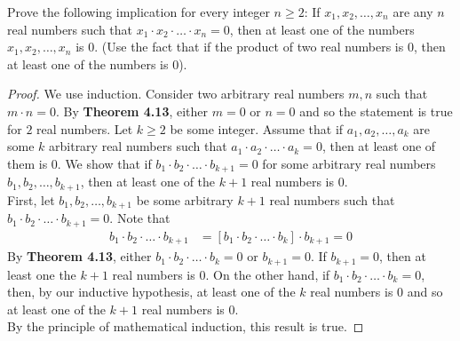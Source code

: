 \documentclass[12pt]{article}
\newenvironment{problem}[2][Problem]{\begin{trivlist}
		\item[\hskip \labelsep {\bfseries #1}\hskip \labelsep {\bfseries #2.}]}{\end{trivlist}}
\begin{document}
\begin{problem}{19}
	Prove the following implication for every integer $n\geq 2$: If $x_{1},x_{2},\ldots,x_{n}$ are any $n$ real numbers such that $x_{1}\cdot x_{2}\cdot \ldots \cdot x_{n} = 0$, then at least one of the numbers $x_{1},x_{2},\ldots,x_{n}$ is 0. (Use the fact that if the product of two real numbers is 0, then at least one of the numbers is 0).
	
	\begin{proof}
		We use induction. Consider two arbitrary real numbers $m,n$ such that $m\cdot n = 0$. By \textbf{Theorem 4.13}, either $m=0$ or $n = 0$ and so the statement is true for $2$ real numbers. Let $k\geq 2$ be some integer. Assume that if $a_{1}, a_{2}, \ldots, a_{k}$ are some $k$ arbitrary real numbers such that $a_{1}\cdot a_{2}\cdot \ldots \cdot a_{k} = 0$, then at least one of them is 0. We show that if $b_{1}\cdot b_{2}\cdot \ldots \cdot b_{k+1} = 0$ for some arbitrary real numbers $b_{1}, b_{2}, \ldots, b_{k+1}$, then at least one of the $k+1$ real numbers is 0. \\
		
		First, let $b_{1}, b_{2}, \ldots, b_{k+1}$ be some arbitrary $k+1$ real numbers such that $b_{1}\cdot b_{2}\cdot \ldots \cdot b_{k+1} = 0$. Note that
		\begin{align*}
			b_{1}\cdot b_{2}\cdot \ldots \cdot b_{k+1} &= [b_{1}\cdot b_{2}\cdot \ldots \cdot b_{k}] \cdot b_{k+1} = 0
		\end{align*}
	By \textbf{Theorem 4.13}, either $b_{1}\cdot b_{2}\cdot \ldots \cdot b_{k} = 0$ or $b_{k+1} = 0$. If $b_{k+1} = 0$, then at least one the $k+1$ real numbers is 0. On the other hand, if $b_{1}\cdot b_{2}\cdot \ldots \cdot b_{k} = 0$, then, by our inductive hypothesis, at least one of the $k$ real numbers is 0 and so at least one of the $k+1$ real numbers is 0.\\
	
	By the principle of mathematical induction, this result is true.
	\end{proof}
\end{problem}
\end{document}
